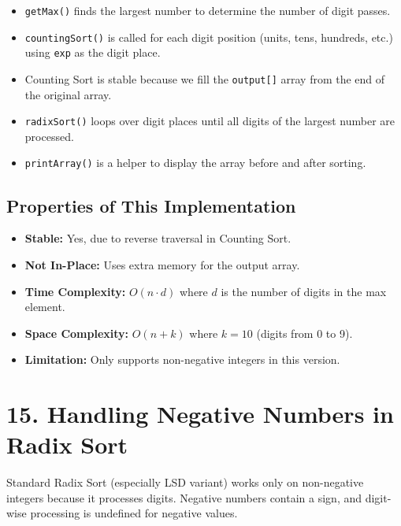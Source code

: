 \documentclass[14pt]{extarticle}
\begin{document}
\begin{itemize}[leftmargin=1.5em]
    \item \texttt{getMax()} finds the largest number to determine the number of digit passes.
    \item \texttt{countingSort()} is called for each digit position (units, tens, hundreds, etc.) using \texttt{exp} as the digit place.
    \item Counting Sort is stable because we fill the \texttt{output[]} array from the end of the original array.
    \item \texttt{radixSort()} loops over digit places until all digits of the largest number are processed.
    \item \texttt{printArray()} is a helper to display the array before and after sorting.
\end{itemize}

\subsection*{Properties of This Implementation}

\begin{itemize}[leftmargin=1.5em]
    \item \textbf{Stable:} Yes, due to reverse traversal in Counting Sort.
    \item \textbf{Not In-Place:} Uses extra memory for the output array.
    \item \textbf{Time Complexity:} $O(n \cdot d)$ where $d$ is the number of digits in the max element.
    \item \textbf{Space Complexity:} $O(n + k)$ where $k = 10$ (digits from 0 to 9).
    \item \textbf{Limitation:} Only supports non-negative integers in this version.
\end{itemize}


\section*{15. Handling Negative Numbers in Radix Sort}

\begin{tcolorbox}[
  colback=white,
  colframe=black,
  title=Problem
]
Standard Radix Sort (especially LSD variant) works only on non-negative integers because it processes digits. Negative numbers contain a sign, and digit-wise processing is undefined for negative values.
\end{tcolorbox}
\end{document}
